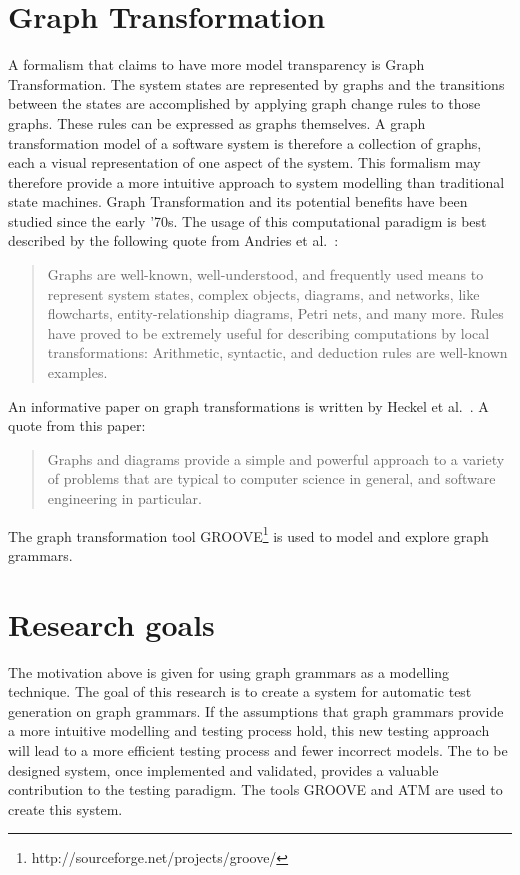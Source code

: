 \section{Graph Transformation}
A formalism that claims to have more model transparency is Graph Transformation. The system states are represented by graphs and the transitions between the states are accomplished by applying graph change rules to those graphs. These rules can be expressed as graphs themselves. A graph transformation model of a software system is therefore a collection of graphs, each a visual representation of one aspect of the system. This formalism may therefore provide a more intuitive approach to system modelling than traditional state machines. Graph Transformation and its potential benefits have been studied since the early '70s. The usage of this computational paradigm is best described by the following quote from Andries et al.~\cite{Andries1999}: \begin{quote}Graphs are well-known, well-understood, and frequently used means to represent system states, complex objects, diagrams, and networks, like flowcharts, entity-relationship diagrams, Petri nets, and many more. Rules have proved to be extremely useful for describing computations by local transformations: Arithmetic, syntactic, and deduction rules are well-known examples.\end{quote} An informative paper on graph transformations is written by Heckel et al.~\cite{Heckel2006187}. A quote from this paper: \begin{quote}Graphs and diagrams provide a simple and powerful approach to a variety of problems that are typical to computer science in general, and software engineering in particular.\end{quote}

The graph transformation tool GROOVE\footnote{http://sourceforge.net/projects/groove/} is used to model and explore graph grammars.

\section{Research goals}\label{sec:goals}
The motivation above is given for using graph grammars as a modelling technique. The goal of this research is to create a system for automatic test generation on graph grammars. If the assumptions that graph grammars provide a more intuitive modelling and testing process hold, this new testing approach will lead to a more efficient testing process and fewer incorrect models. The to be designed system, once implemented and validated, provides a valuable contribution to the testing paradigm. The tools GROOVE and ATM are used to create this system.

